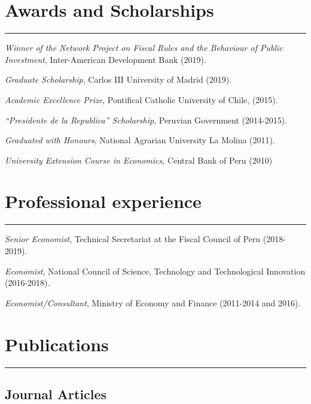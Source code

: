 \documentclass[letterpaper, Biolinum]{article}
\renewenvironment{itemize}{
  \begin{list}{}{
    \setlength{\leftmargin}{1.5em}
  }
}{
  \end{list}
}
\begin{document}
\section*{Awards and Scholarships}
\vspace{-0.1in}
\hrule
\vspace{0.1in}
\begin{itemize} 
\item \textit{Winner of the Network Project on Fiscal Rules and the Behaviour of Public Investment}, Inter-American Development Bank (2019).
\item \textit{Graduate Scholarship}, Carlos III University of Madrid (2019). 
\item \textit{Academic Excellence Prize}, Pontifical Catholic University of Chile, (2015).
\item \textit{``Presidente de la Republica'' Scholarship}, Peruvian Government (2014-2015). 
\item \textit{Graduated with Honours}, National Agrarian University La Molina (2011). 
\item \textit{University Extension Course in Economics,} Central Bank of Peru (2010)
\end{itemize}

\section*{Professional experience}
\vspace{-0.1in}
\hrule
\vspace{0.1in}
\begin{itemize}
\item \textit{Senior Economist}, Technical Secretariat at the Fiscal Council of Peru (2018-2019).
\item \textit{Economist}, National Council of Science, Technology and Technological Innovation (2016-2018).
\item \textit{Economist/Consultant}, Ministry of Economy and Finance (2011-2014 and 2016).

\end{itemize}


\section*{Publications}
\vspace{-0.1in}
\hrule
\vspace{0.1in}
\subsection*{Journal Articles}
\end{document}
